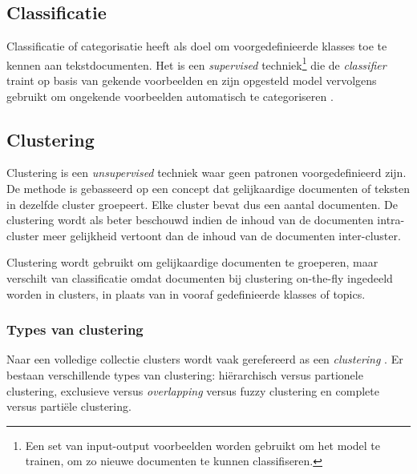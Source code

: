 \subsection{Classificatie}\label{classificatie}
Classificatie of categorisatie heeft als doel om voorgedefinieerde klasses toe te kennen aan tekstdocumenten. Het is een \textit{supervised} techniek\footnote{Een set van input-output voorbeelden worden gebruikt om het model te trainen, om zo nieuwe documenten te kunnen classifiseren.} die de \textit{classifier} traint op basis van gekende voorbeelden en zijn opgesteld model vervolgens gebruikt om ongekende voorbeelden automatisch te categoriseren \cite{Nasa2012}. 


\subsection{Clustering}\label{clustering}
Clustering is een \textit{unsupervised} techniek waar geen patronen voorgedefinieerd zijn. De methode is gebasseerd op een concept dat gelijkaardige documenten of teksten in dezelfde cluster groepeert. Elke cluster bevat dus een aantal documenten. De clustering wordt als beter beschouwd indien de inhoud van de documenten intra-cluster meer gelijkheid vertoont dan de inhoud van de documenten inter-cluster.

Clustering wordt gebruikt om gelijkaardige documenten te groeperen, maar verschilt van classificatie omdat documenten bij clustering on-the-fly ingedeeld worden in clusters, in plaats van in vooraf gedefinieerde klasses of topics.

\subsubsection{Types van clustering}
Naar een volledige collectie clusters wordt vaak gerefereerd as een \textit{clustering} \cite{Tan2005}. Er bestaan verschillende types van clustering: hi\"erarchisch versus partionele clustering, exclusieve versus \textit{overlapping} versus fuzzy clustering en complete versus parti\"ele clustering. 

